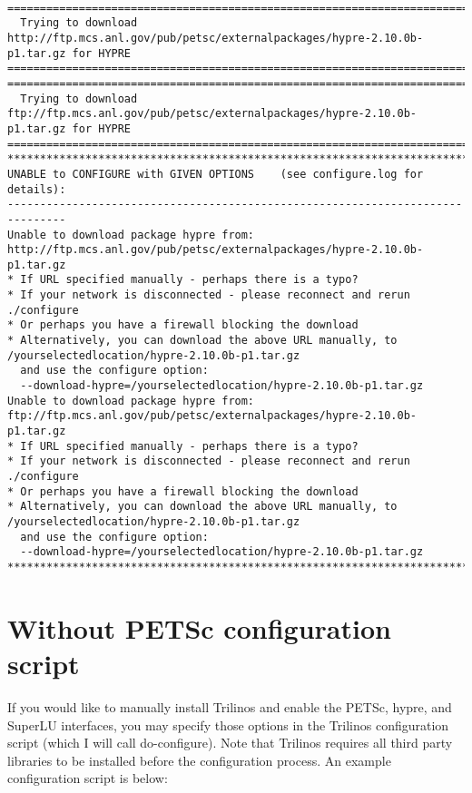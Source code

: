 \documentclass[pdf,12pt,report,strict]{SANDreport}
\begin{document}
{\tt \scriptsize
\begin{verbatim}
===============================================================================                                                                
  Trying to download http://ftp.mcs.anl.gov/pub/petsc/externalpackages/hypre-2.10.0b-p1.tar.gz for HYPRE 
=============================================================================== 
===============================================================================                                                                
  Trying to download ftp://ftp.mcs.anl.gov/pub/petsc/externalpackages/hypre-2.10.0b-p1.tar.gz for HYPRE 
===============================================================================                                                                                                                                                                                                   ******************************************************************************* UNABLE to CONFIGURE with GIVEN OPTIONS    (see configure.log for details):
-------------------------------------------------------------------------------
Unable to download package hypre from: http://ftp.mcs.anl.gov/pub/petsc/externalpackages/hypre-2.10.0b-p1.tar.gz
* If URL specified manually - perhaps there is a typo?
* If your network is disconnected - please reconnect and rerun ./configure
* Or perhaps you have a firewall blocking the download
* Alternatively, you can download the above URL manually, to /yourselectedlocation/hypre-2.10.0b-p1.tar.gz
  and use the configure option:
  --download-hypre=/yourselectedlocation/hypre-2.10.0b-p1.tar.gz
Unable to download package hypre from: ftp://ftp.mcs.anl.gov/pub/petsc/externalpackages/hypre-2.10.0b-p1.tar.gz
* If URL specified manually - perhaps there is a typo?
* If your network is disconnected - please reconnect and rerun ./configure
* Or perhaps you have a firewall blocking the download
* Alternatively, you can download the above URL manually, to /yourselectedlocation/hypre-2.10.0b-p1.tar.gz
  and use the configure option:
  --download-hypre=/yourselectedlocation/hypre-2.10.0b-p1.tar.gz
*******************************************************************************
\end{verbatim}
}

\section{Without PETSc configuration script}
If you would like to manually install Trilinos and enable the PETSc, hypre, and
SuperLU interfaces, you may specify those options in the Trilinos configuration
script (which I will call do-configure).  Note that Trilinos requires all third
party libraries to be installed before the configuration process.  An example
configuration script is below:
\end{document}
